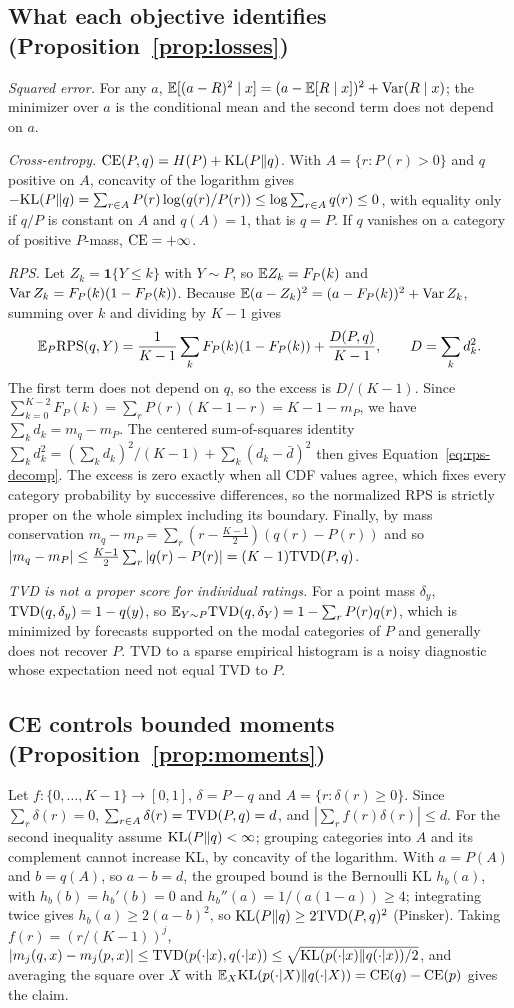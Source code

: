\subsection{What each objective identifies (Proposition~\ref{prop:losses})}
\emph{Squared error.} For any $a$, $\mathbb{E}[(a-R)^2\mid x]=(a-\mathbb{E}[R\mid x])^2+\operatorname{Var}(R\mid x)$; the minimizer over $a$ is the conditional mean and the second term does not depend on $a$.

\emph{Cross-entropy.} $\mathrm{CE}(P,q)=H(P)+\mathrm{KL}(P\|q)$.
With $A=\{r:P(r)>0\}$ and $q$ positive on $A$, concavity of the logarithm gives $-\mathrm{KL}(P\|q)=\sum_{r\in A}P(r)\log(q(r)/P(r))\le\log\sum_{r\in A}q(r)\le0$, with equality only if $q/P$ is constant on $A$ and $q(A)=1$, that is $q=P$.
If $q$ vanishes on a category of positive $P$-mass, $\mathrm{CE}=+\infty$.

\emph{RPS.} Let $Z_k=\mathbf 1\{Y\le k\}$ with $Y\sim P$, so $\mathbb{E} Z_k=F_P(k)$ and $\operatorname{Var} Z_k=F_P(k)(1-F_P(k))$.
Because $\mathbb{E}(a-Z_k)^2=(a-F_P(k))^2+\operatorname{Var} Z_k$, summing over $k$ and dividing by $K-1$ gives
\[
\mathbb{E}_P\mathrm{RPS}(q,Y)=\frac1{K-1}\sum_kF_P(k)(1-F_P(k))+\frac{D(P,q)}{K-1},\qquad D=\sum_kd_k^2 .
\]
The first term does not depend on $q$, so the excess is $D/(K-1)$.
Since $\sum_{k=0}^{K-2}F_P(k)=\sum_rP(r)(K-1-r)=K-1-m_P$, we have $\sum_kd_k=m_q-m_P$.
The centered sum-of-squares identity $\sum_kd_k^2=(\sum_kd_k)^2/(K-1)+\sum_k(d_k-\bar d)^2$ then gives Equation~\eqref{eq:rps-decomp}.
The excess is zero exactly when all CDF values agree, which fixes every category probability by successive differences, so the normalized RPS is strictly proper on the whole simplex including its boundary.
Finally, by mass conservation $m_q-m_P=\sum_r(r-\tfrac{K-1}2)(q(r)-P(r))$ and so $|m_q-m_P|\le\tfrac{K-1}2\sum_r|q(r)-P(r)|=(K-1)\mathrm{TVD}(P,q)$.

\emph{TVD is not a proper score for individual ratings.}
For a point mass $\delta_y$, $\mathrm{TVD}(q,\delta_y)=1-q(y)$, so $\mathbb{E}_{Y\sim P}\mathrm{TVD}(q,\delta_Y)=1-\sum_rP(r)q(r)$, which is minimized by forecasts supported on the modal categories of $P$ and generally does not recover $P$.
TVD to a sparse empirical histogram is a noisy diagnostic whose expectation need not equal TVD to $P$.

\subsection{CE controls bounded moments (Proposition~\ref{prop:moments})}
Let $f:\{0,\dots,K-1\}\to[0,1]$, $\delta=P-q$ and $A=\{r:\delta(r)\ge0\}$.
Since $\sum_r\delta(r)=0$, $\sum_{r\in A}\delta(r)=\mathrm{TVD}(P,q)=d$, and $|\sum_rf(r)\delta(r)|\le d$.
For the second inequality assume $\mathrm{KL}(P\|q)<\infty$; grouping categories into $A$ and its complement cannot increase KL, by concavity of the logarithm.
With $a=P(A)$ and $b=q(A)$, so $a-b=d$, the grouped bound is the Bernoulli KL $h_b(a)$, with $h_b(b)=h_b'(b)=0$ and $h_b''(a)=1/(a(1-a))\ge4$; integrating twice gives $h_b(a)\ge2(a-b)^2$, so $\mathrm{KL}(P\|q)\ge2\mathrm{TVD}(P,q)^2$ (Pinsker).
Taking $f(r)=(r/(K-1))^j$, $|m_j(q,x)-m_j(p,x)|\le\mathrm{TVD}(p(\cdot|x),q(\cdot|x))\le\sqrt{\mathrm{KL}(p(\cdot|x)\|q(\cdot|x))/2}$, and averaging the square over $X$ with $\mathbb{E}_X\mathrm{KL}(p(\cdot|X)\|q(\cdot|X))=\mathrm{CE}(q)-\mathrm{CE}(p)$ gives the claim.

